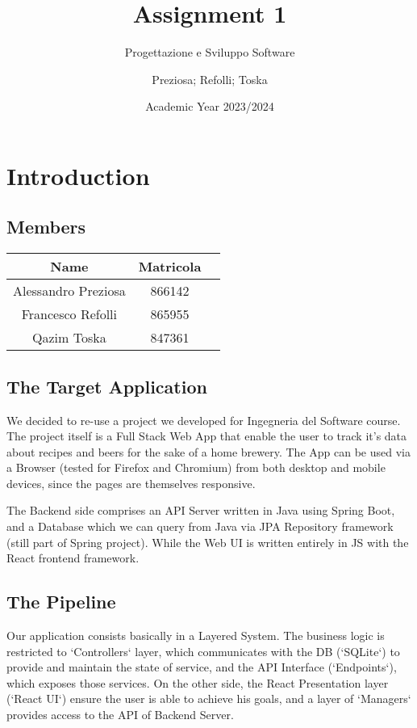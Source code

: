 \documentclass[a4paper,10pt]{scrartcl}
\title{Assignment 1}
\subtitle{Progettazione e Sviluppo Software}
\author{Preziosa; Refolli; Toska}
\date{Academic Year 2023/2024}
\begin{document}
\maketitle

\section{Introduction}

\subsection{Members}

\begin{center}
    \begin{tabular}{|c|c|c|}
        \hline
        Name & Matricola \\
        \hline
        Alessandro Preziosa & 866142 \\
        \hline
        Francesco Refolli & 865955 \\
        \hline
        Qazim Toska & 847361 \\
        \hline
    \end{tabular}
\end{center}

\subsection{The Target Application}

We decided to re-use a project we developed for Ingegneria del Software course. The project itself is a Full Stack Web App that enable the user to track it's data about recipes and beers for the sake of a home brewery. The App can be used via a Browser (tested for Firefox and Chromium) from both desktop and mobile devices, since the pages are themselves responsive.

The Backend side comprises an API Server written in Java using Spring Boot, and a Database which we can query from Java via JPA Repository framework (still part of Spring project). While the Web UI is written entirely in JS with the React frontend framework.

\subsection{The Pipeline}

Our application consists basically in a Layered System. The business logic is restricted to `Controllers` layer, which communicates with the DB (`SQLite`) to provide and maintain the state of service, and the API Interface (`Endpoints`), which exposes those services. On the other side, the React Presentation layer (`React UI`) ensure the user is able to achieve his goals, and a layer of `Managers` provides access to the API of Backend Server.
\end{document}
